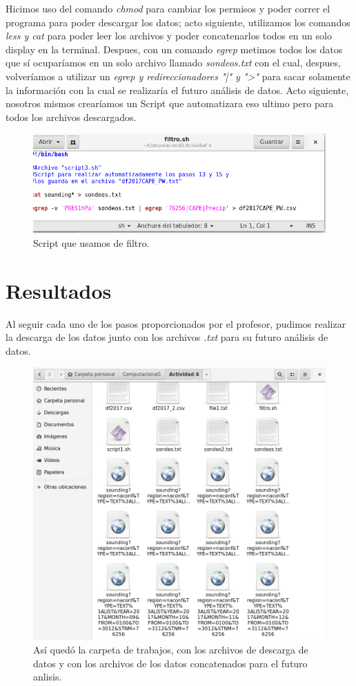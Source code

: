\documentclass{article}
\begin{document}
Hicimos uso del comando \textit{chmod} para cambiar los permisos y poder correr el programa para poder descargar los datos; acto siguiente, utilizamos los comandos \textit{less y cat} para poder leer los archivos y poder concatenarlos todos en un solo display en la terminal. 
Despues, con un comando \textit{egrep} metimos todos los datos que sí ocuparíamos en un solo archivo llamado \textit{sondeos.txt} con el cual, despues, volveríamos a utilizar un \textit{egrep y redireccionadores "|" y ">"} para sacar solamente la información con la cual se realizaría el futuro análisis de datos. 
Acto siguiente, nosotros mismos crearíamos un Script que automatizara eso ultimo pero para todos los archivos descargados. 

\begin{figure}
\includegraphics[width=\linewidth]{Filtro.png}
\caption{Script que usamos de filtro.}
\end{figure}

\section{Resultados}
Al seguir cada uno de los pasos proporcionados por el profesor, pudimos realizar la descarga de los datos junto con los archivos \textit{.txt} para su futuro análisis de datos.

\begin{figure}
\includegraphics[width=\linewidth]{Sondeos.png}
\caption{Así quedó la carpeta de trabajos, con los archivos de descarga de datos y con los archivos de los datos concatenados para el futuro anlisis.}
\end{figure}
\end{document}
